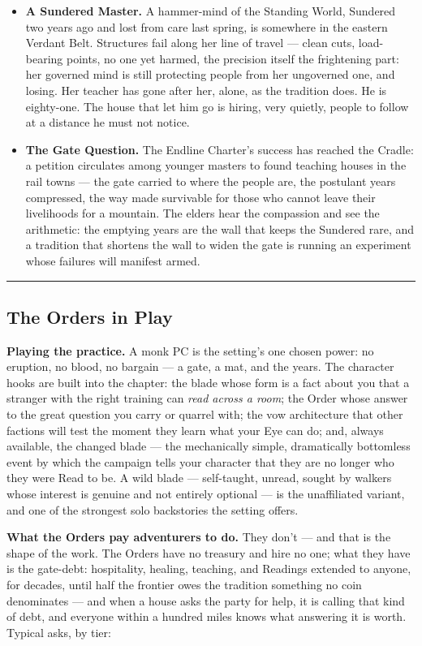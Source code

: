\begin{itemize}
    \item \textbf{A Sundered Master.} A hammer-mind of the Standing World, Sundered two years ago and lost from care last spring, is somewhere in the eastern Verdant Belt. Structures fail along her line of travel --- clean cuts, load-bearing points, no one yet harmed, the precision itself the frightening part: her governed mind is still protecting people from her ungoverned one, and losing. Her teacher has gone after her, alone, as the tradition does. He is eighty-one. The house that let him go is hiring, very quietly, people to follow at a distance he must not notice.
    \item \textbf{The Gate Question.} The Endline Charter's success has reached the Cradle: a petition circulates among younger masters to found teaching houses in the rail towns --- the gate carried to where the people are, the postulant years compressed, the way made survivable for those who cannot leave their livelihoods for a mountain. The elders hear the compassion and see the arithmetic: the emptying years are the wall that keeps the Sundered rare, and a tradition that shortens the wall to widen the gate is running an experiment whose failures will manifest armed.
\end{itemize}

\medskip\hrule\medskip

\subsection{The Orders in Play}

\textbf{Playing the practice.} A monk PC is the setting's one chosen power: no eruption, no blood, no bargain --- a gate, a mat, and the years. The character hooks are built into the chapter: the blade whose form is a fact about you that a stranger with the right training can \textit{read across a room}; the Order whose answer to the great question you carry or quarrel with; the vow architecture that other factions will test the moment they learn what your Eye can do; and, always available, the changed blade --- the mechanically simple, dramatically bottomless event by which the campaign tells your character that they are no longer who they were Read to be. A wild blade --- self-taught, unread, sought by walkers whose interest is genuine and not entirely optional --- is the unaffiliated variant, and one of the strongest solo backstories the setting offers.

\textbf{What the Orders pay adventurers to do.} They don't --- and that is the shape of the work. The Orders have no treasury and hire no one; what they have is the gate-debt: hospitality, healing, teaching, and Readings extended to anyone, for decades, until half the frontier owes the tradition something no coin denominates --- and when a house asks the party for help, it is calling that kind of debt, and everyone within a hundred miles knows what answering it is worth. Typical asks, by tier:

